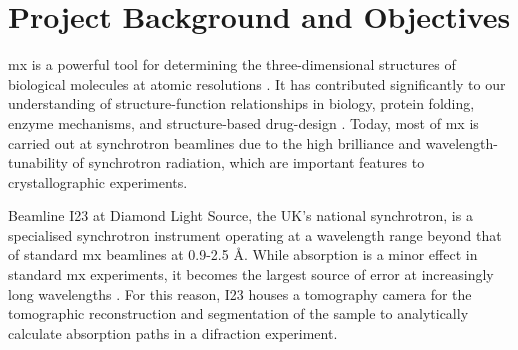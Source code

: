 \section{Project Background and Objectives}

\ac{mx} is a powerful tool for determining the three-dimensional structures of biological molecules at atomic resolutions \cite{Gorrec2021}. It has contributed significantly to our understanding of structure-function relationships in biology, protein folding, enzyme mechanisms, and structure-based drug-design \cite{Foerster2019}. Today, most of \ac{mx} is carried out at synchrotron beamlines due to the high brilliance and wavelength-tunability of synchrotron radiation, which are important features to crystallographic experiments.

Beamline I23 at Diamond Light Source, the UK's national synchrotron, is a specialised synchrotron instrument operating at a wavelength range beyond that of standard \ac{mx} beamlines at 0.9-2.5 Å. While absorption is a minor effect in standard \ac{mx} experiments, it becomes the largest source of error at increasingly long wavelengths \cite{Lu2024}. For this reason, I23 houses a tomography camera for the tomographic reconstruction and segmentation of the sample to analytically calculate absorption paths in a difraction experiment. %


